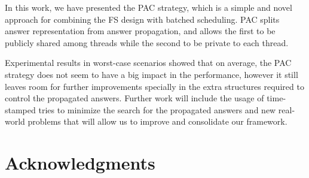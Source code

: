 \documentclass{llncs}
\begin{document}
In this work, we have presented the PAC strategy, which is a simple
and novel approach for combining the FS design with batched
scheduling. PAC splits answer representation from answer propagation,
and allows the first to be publicly shared among threads while the
second to be private to each thread.

Experimental results in worst-case scenarios showed that on average,
the PAC strategy does not seem to have a big impact in the
performance, however it still leaves room for further improvements
specially in the extra structures required to control the propagated
answers. Further work will include the usage of time-stamped tries to
minimize the search for the propagated answers and new real-world
problems that will allow us to improve and consolidate our framework.


\section*{Acknowledgments}






\end{document}
